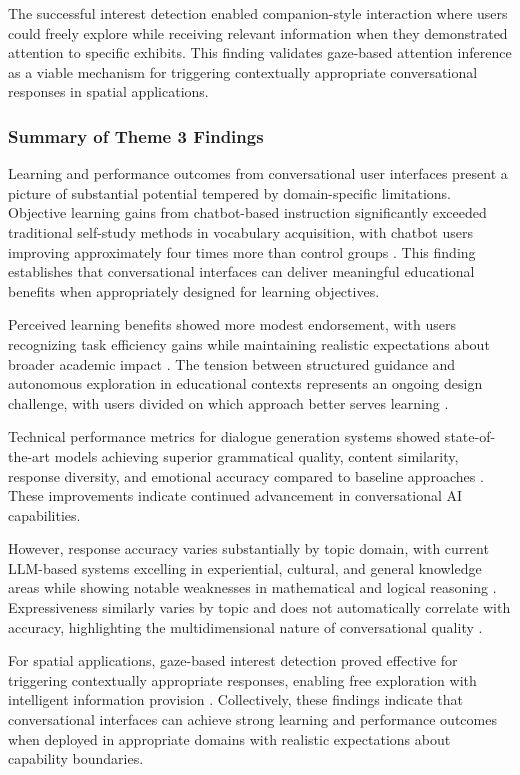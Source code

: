 \documentclass[manuscript,anonymous,sigconf]{acmart}
\begin{document}
The successful interest detection enabled companion-style interaction where users could freely explore while receiving relevant information when they demonstrated attention to specific exhibits. This finding validates gaze-based attention inference as a viable mechanism for triggering contextually appropriate conversational responses in spatial applications.

\subsubsection{Summary of Theme 3 Findings}

Learning and performance outcomes from conversational user interfaces present a picture of substantial potential tempered by domain-specific limitations. Objective learning gains from chatbot-based instruction significantly exceeded traditional self-study methods in vocabulary acquisition, with chatbot users improving approximately four times more than control groups \cite{A34}. This finding establishes that conversational interfaces can deliver meaningful educational benefits when appropriately designed for learning objectives.

Perceived learning benefits showed more modest endorsement, with users recognizing task efficiency gains while maintaining realistic expectations about broader academic impact \cite{A22}. The tension between structured guidance and autonomous exploration in educational contexts represents an ongoing design challenge, with users divided on which approach better serves learning \cite{A82}.

Technical performance metrics for dialogue generation systems showed state-of-the-art models achieving superior grammatical quality, content similarity, response diversity, and emotional accuracy compared to baseline approaches \cite{A47}. These improvements indicate continued advancement in conversational AI capabilities.

However, response accuracy varies substantially by topic domain, with current LLM-based systems excelling in experiential, cultural, and general knowledge areas while showing notable weaknesses in mathematical and logical reasoning \cite{A81}. Expressiveness similarly varies by topic and does not automatically correlate with accuracy, highlighting the multidimensional nature of conversational quality \cite{A81}.

For spatial applications, gaze-based interest detection proved effective for triggering contextually appropriate responses, enabling free exploration with intelligent information provision \cite{A82}. Collectively, these findings indicate that conversational interfaces can achieve strong learning and performance outcomes when deployed in appropriate domains with realistic expectations about capability boundaries.
\end{document}
